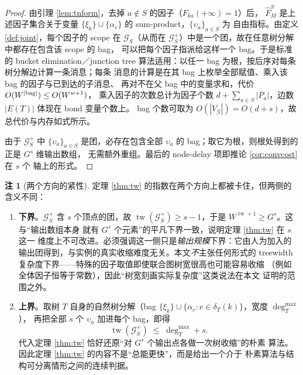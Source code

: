 \documentclass[a4paper,11pt]{article}
\theoremstyle{definition}
\newtheorem{remark}{注}
\newcommand{\1}{\mathbf 1}
\newcommand{\tw}{\operatorname{tw}}
\newcommand{\Gcal}{\mathcal G}
\begin{document}
\begin{proof}
由引理 \ref{lem:tnform}，去掉 $a\notin S$ 的因子（$F_{ka}(+\infty)=1$）后，
$\widehat F^{S}_{M}$ 是上述因子集合关于变量
$\{\xi_k\}\cup\{\alpha_e\}$ 的 sum-product，$\{\upsilon_a\}_{a\in S}$ 为
自由指标。由定义 \ref{def:joint}，每个因子的 scope 在 $\Gcal_S$（从而在
$\Gcal_S^{+}$）中是一个团，故在任意树分解中都存在包含该 scope 的 bag，
可以把每个因子指派给这样一个 bag。于是标准的 bucket elimination／junction
tree 算法适用：以任一 bag 为根，按后序对每条树分解边计算一条消息；每条
消息的计算是在其 bag 上枚举全部赋值、乘入该 bag 的因子与已到达的子消息、
再对不在父 bag 中的变量求和，代价 $O(W^{|{\rm bag}|})\le O(W^{w+1})$，
乘入因子的次数总计为因子个数
$d+\sum_{a\in S}|P_a|$，边数 $|E(T)|$ 体现在 bond 变量个数上。
bag 个数可取为 $O(|V_{\Gcal}|)=O(d+s)$，故总代价与内存如式所示。

由于 $\Gcal_S^{+}$ 中 $\{\upsilon_a\}_{a\in S}$ 是团，必存在包含全部
$\upsilon_a$ 的 bag；取它为根，则根处得到的正是 $G^{s}$ 维输出数组，
无需额外重组。最后的 node-delay 项即推论 \ref{cor:convcost} 在 $s$ 个
轴上的形式。
\end{proof}

\begin{remark}[两个方向的紧性]
\label{rem:twtight}
定理 \ref{thm:tw} 的指数在两个方向上都被卡住，但两侧的含义不同：
\begin{enumerate}[label=(\arabic*)]
\item \textbf{下界}。$\Gcal_S^{+}$ 含 $s$ 个顶点的团，故
$\tw(\Gcal_S^{+})\ge s-1$，于是 $W^{\tw+1}\ge G^{s}$。这与“输出数组本身
就有 $G^{s}$ 个元素”的平凡下界一致，说明定理 \ref{thm:tw} 在 $s$ 这一
维度上不可改进。必须强调这一侧只是\emph{输出规模}下界：它由人为加入的
输出团得到，与实例的真实收缩难度无关。本文\emph{不}主张任何形式的
treewidth 复杂度下界——特殊的因子取值即使联合图树宽很高也可能容易收缩
（例如全体因子恒等于常数），因此“树宽刻画实际复杂度”这类说法在本文
证明的范围之外。
\item \textbf{上界}。取树 $T$ 自身的自然树分解（bag
$\{\xi_k\}\cup\{\alpha_e:e\in\delta_T(k)\}$，宽度 $\deg_T^{\max}$），
再把全部 $s$ 个 $\upsilon_a$ 加进每个 bag，即得
\[
\tw(\Gcal_S^{+})\;\le\;\deg_T^{\max}+s .
\]
代入定理 \ref{thm:tw} 恰好还原“对 $G^{s}$ 个输出点各做一次树收缩”的朴素
算法。因此定理 \ref{thm:tw} 的内容不是“总能更快”，而是给出一个介于
朴素算法与结构可分离情形之间的连续判据。
\end{enumerate}
\end{remark}
\end{document}
